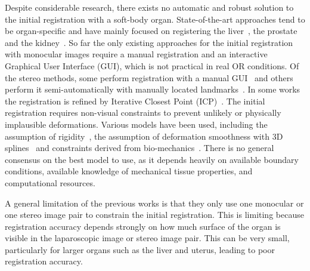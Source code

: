 Despite considerable research, there exists no automatic and robust solution to the initial registration with a soft-body organ. State-of-the-art approaches tend to be organ-specific and have mainly focused on registering the liver~\cite{haouchine13,haouchine:hal-01186011,plantefeve:hal-01205194}, the prostate~\cite{Cohen2010Prostate} and the kidney~\cite{Su2009,nosrati2014simultaneous,affineTracking}.
So far the only existing approaches for the initial registration with monocular images require a manual registration \cite{affineTracking} and an interactive Graphical User Interface (GUI), which is not practical in real OR conditions. 
Of the stereo methods, some perform registration with a manual GUI~\cite{Cohen2010Prostate,haouchine13} and others perform it semi-automatically with manually located landmarks~\cite{21142942,conf/miccai/Amir-KhaliliNPHA13,hamarneh2014igrs,Su2009}. In some works the registration is refined by Iterative Closest Point (ICP)~\cite{hamarneh2014igrs,Su2009}. %
The initial registration requires non-visual constraints to prevent unlikely or physically implausible deformations. Various models have been used, including the assumption of rigidity~\cite{Su2009}, the assumption of deformation smoothness with 3D splines~\cite{conf/miccai/Amir-KhaliliNPHA13} and constraints derived from bio-mechanics~\cite{hamarneh2014igrs,haouchine13}. 
There is no general consensus on the best model to use, as it depends heavily on available boundary conditions, available knowledge of mechanical tissue properties, and computational resources. 

A general limitation of the previous works is that they only use one monocular or one stereo image pair to constrain the initial registration.
This is limiting because registration accuracy depends strongly on how much surface of the organ is visible in the laparoscopic image or stereo image pair. 
This can be very small, particularly for larger organs such as the liver and uterus, leading to poor registration accuracy. 


